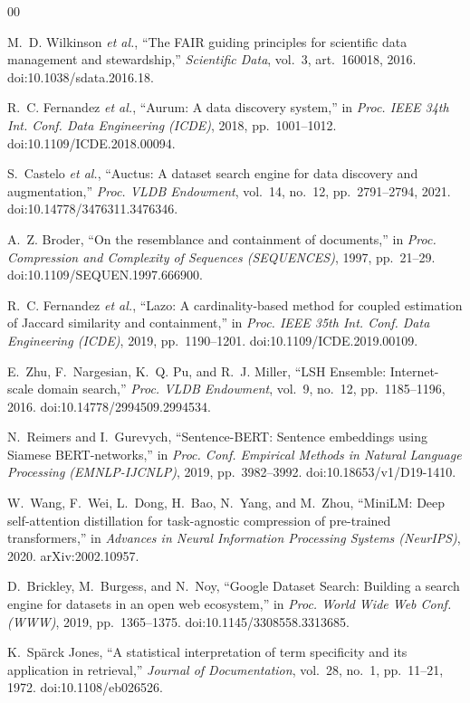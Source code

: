 \documentclass[journal]{IEEEtran}
\begin{document}
\balance

\begin{thebibliography}{00}

 M.~D. Wilkinson \emph{et al.}, ``The FAIR guiding principles for scientific data management and
stewardship,'' \emph{Scientific Data}, vol.~3, art.~160018, 2016. doi:10.1038/sdata.2016.18.

 R.~C. Fernandez \emph{et al.}, ``Aurum: A data discovery system,'' in \emph{Proc. IEEE 34th Int.
Conf. Data Engineering (ICDE)}, 2018, pp.~1001--1012. doi:10.1109/ICDE.2018.00094.

 S.~Castelo \emph{et al.}, ``Auctus: A dataset search engine for data discovery and
augmentation,'' \emph{Proc. VLDB Endowment}, vol.~14, no.~12, pp.~2791--2794, 2021.
doi:10.14778/3476311.3476346.

 A.~Z. Broder, ``On the resemblance and containment of documents,'' in \emph{Proc. Compression
and Complexity of Sequences (SEQUENCES)}, 1997, pp.~21--29. doi:10.1109/SEQUEN.1997.666900.

 R.~C. Fernandez \emph{et al.}, ``Lazo: A cardinality-based method for coupled estimation of
Jaccard similarity and containment,'' in \emph{Proc. IEEE 35th Int. Conf. Data Engineering (ICDE)}, 2019,
pp.~1190--1201. doi:10.1109/ICDE.2019.00109.

 E.~Zhu, F.~Nargesian, K.~Q. Pu, and R.~J. Miller, ``LSH Ensemble: Internet-scale domain
search,'' \emph{Proc. VLDB Endowment}, vol.~9, no.~12, pp.~1185--1196, 2016. doi:10.14778/2994509.2994534.

 N.~Reimers and I.~Gurevych, ``Sentence-BERT: Sentence embeddings using Siamese BERT-networks,''
in \emph{Proc. Conf. Empirical Methods in Natural Language Processing (EMNLP-IJCNLP)}, 2019, pp.~3982--3992.
doi:10.18653/v1/D19-1410.

 W.~Wang, F.~Wei, L.~Dong, H.~Bao, N.~Yang, and M.~Zhou, ``MiniLM: Deep self-attention
distillation for task-agnostic compression of pre-trained transformers,'' in \emph{Advances in Neural
Information Processing Systems (NeurIPS)}, 2020. arXiv:2002.10957.

 D.~Brickley, M.~Burgess, and N.~Noy, ``Google Dataset Search: Building a search engine for
datasets in an open web ecosystem,'' in \emph{Proc. World Wide Web Conf. (WWW)}, 2019, pp.~1365--1375.
doi:10.1145/3308558.3313685.

 K.~Sp\"arck Jones, ``A statistical interpretation of term specificity and its application in
retrieval,'' \emph{Journal of Documentation}, vol.~28, no.~1, pp.~11--21, 1972. doi:10.1108/eb026526.


\end{thebibliography}
\end{document}
